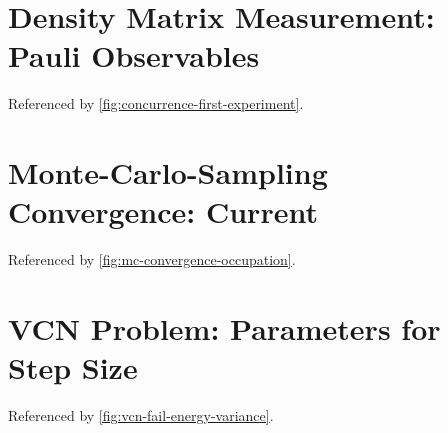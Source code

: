 \newpage
{}
\newpage
\begin{minipage}{\textwidth}
    \section{Density Matrix Measurement: Pauli Observables} %
        \label{appendix:pauli-measurements}
        Referenced by \autoref{fig:concurrence-first-experiment}.\\
        \vbox{
        }
\end{minipage}

\newpage
{}
\newpage
\begin{minipage}{\textwidth}
    \section{Monte-Carlo-Sampling Convergence: Current} %
        \label{appendix:mc-convergence-spin-current}
        Referenced by \autoref{fig:mc-convergence-occupation}.\\
        \vbox{
        }
\end{minipage}

\newpage
{}
\newpage
\begin{minipage}{\textwidth}
    \section{VCN Problem: Parameters for Step Size} %
        \label{appendix:vcn-fail-parameters}
        Referenced by \autoref{fig:vcn-fail-energy-variance}.\\
        \vbox{
        }
\end{minipage}

